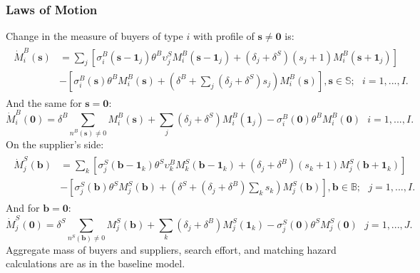 \documentclass[12pt]{article} \usepackage{amsmath,amssymb,amsthm,geometry,graphicx,setspace,algorithm,algpseudocode,float}
\begin{document}
\subsubsection{Laws of Motion}

Change in the measure of buyers of type $i$ with profile of $\mathbf{s} \neq \mathbf{0}$ is:
\begin{align}
\begin{split}
\dot{M}_{i}^{B}(\mathbf{s}) &= \sum_{j}\left[ \sigma _{i}^{B}(\mathbf{s}%
-\mathbf{1}_{j})\theta ^{B}\upsilon _{j}^{S}M_{i}^{B}(\mathbf{s}-\mathbf{1}_{j})+(\delta_j + \delta^S) (s_{j}+1)M_{i}^{B}(\mathbf{s}+\mathbf{1}_{j})\right] \\
&-\left[ \sigma _{i}^{B}(\mathbf{s})\theta ^{B}M_{i}^{B}(\mathbf{s})+\left(\delta^B + \sum_j (\delta_j + \delta^S) s_{j}\right) M_i^B(\mathbf{s}) \right] , \mathbf{s} \in \mathbb{S};\text{ }%
i=1,...,I .
\end{split}
\end{align}%
And the same for $\mathbf{s} = \mathbf{0}$:
\begin{equation}
\dot{M}_{i}^{B}(\mathbf{0})= \delta^B \sum_{n^B\left(\mathbf{s}\right) \neq 0} M_i^B(\mathbf{s}) + \sum_{j} \left(\delta_j + \delta^S\right) M_{i}^{B}(\mathbf{1}_{j})-\sigma
_{i}^{B}(\mathbf{0})\theta ^{B}M_{i}^{B}(\mathbf{0})\text{ \ \ }i=1,...,I.
\label{eom_buy2}
\end{equation}
On the supplier's side:
\begin{align}
\begin{split}
\dot{M}_{j}^{S}(\mathbf{b}) &= \sum_{k}\left[ \sigma _{j}^{S}(\mathbf{b}%
-\mathbf{1}_{k})\theta ^{S}\upsilon _{k}^{B}M_{k}^{S}(\mathbf{b}-\mathbf{1}_{k})+\left(\delta_j + \delta^B\right)(s_{k}+1)M_{j}^{S}(\mathbf{b}+\mathbf{1}_{k})\right] \\
&-\left[ \sigma _{j}^{S}(\mathbf{b})\theta ^{S}M_{j}^{S}(\mathbf{b})+ \left(\delta^S + \left(\delta_j + \delta^B\right)\sum_k s_{k} \right)M_j^S(\mathbf{b}) \right] , \mathbf{b} \in \mathbb{B};\text{ }%
j=1,...,I . 
\end{split}
\end{align}%
And for $\mathbf{b} = \mathbf{0}$:
\begin{equation}
\dot{M}_{j}^{S}(\mathbf{0})= \delta^S \sum_{n^S\left(\mathbf{b}\right) \neq 0} M_j^S(\mathbf{b}) + \sum_{k} \left(\delta_j + \delta^B\right) M_{j}^{S}(\mathbf{1}_{k})-\sigma
_{j}^{S}(\mathbf{0})\theta ^{S}M_{j}^{S}(\mathbf{0})\text{ \ \ }j=1,...,J.
\label{eom_buy2}
\end{equation}
Aggregate mass of buyers and suppliers, search effort, and matching hazard calculations are as in the baseline model.
\end{document}
